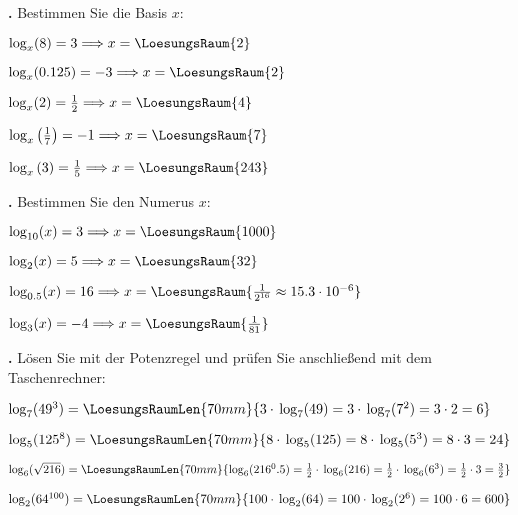 \newpage

\textbf{\bbwAufgabenNummer{}.}
Bestimmen Sie die Basis $x$:

\begin{bbwAufgabenBlock}
\item $\log_x(8) = 3 \Longrightarrow x =    \LoesungsRaum{2}$
\item $\log_x(0.125) = -3 \Longrightarrow x =    \LoesungsRaum{2}$
\item $\log_x(2) = \frac12 \Longrightarrow x =    \LoesungsRaum{4}$
\item $\log_x\left(\frac17\right) = -1 \Longrightarrow x =    \LoesungsRaum{7}$
\item $\log_x\left( 3 \right) = \frac15 \Longrightarrow x =    \LoesungsRaum{243}$

\end{bbwAufgabenBlock}


\newpage

\textbf{\bbwAufgabenNummer{}.}
Bestimmen Sie den Numerus $x$:

\begin{bbwAufgabenBlock}
\item $\log_{10}(x)  =  3 \Longrightarrow x =    \LoesungsRaum{1000}$
\item $\log_{2}(x)   =  5 \Longrightarrow x =    \LoesungsRaum{32}$
\item $\log_{0.5}(x) = 16 \Longrightarrow x =    \LoesungsRaum{\frac1{2^{16}}\approx 15.3\cdot{}10^{-6}}$
\item $\log_{3}(x)   = -4 \Longrightarrow x =    \LoesungsRaum{\frac1{81}}$
\end{bbwAufgabenBlock}

\newpage

\textbf{\bbwAufgabenNummer{}.}
Lösen Sie mit der Potenzregel und prüfen Sie anschließend mit dem Taschenrechner: 

\begin{bbwAufgabenBlock}
\item $\log_7(49^3) = \LoesungsRaumLen{70mm}{3\cdot{}\log_7(49) = 3 \cdot{}  \log_7(7^2) = 3\cdot{} 2 = 6}$

\item
 $\log_5(125^8) = \LoesungsRaumLen{70mm}{8 \cdot{}\log_5(125) = 8 \cdot{}  \log_5(5^3) =  8\cdot{} 3 = 24}$

\item  $\log_6(\sqrt{216}) = \LoesungsRaumLen{70mm}{\log_6(216^0.5)= \frac12
   \cdot{}\log_6(216) = \frac12 \cdot{}  \log_6(6^3) = \frac12\cdot{} 3 = \frac32}$
   
\item $\log_2(64^{100}) = \LoesungsRaumLen{70mm}{100 \cdot{}\log_2(64) = 100 \cdot{}  \log_2(2^6) =  100\cdot{} 6 = 600}$

%
\end{bbwAufgabenBlock}


